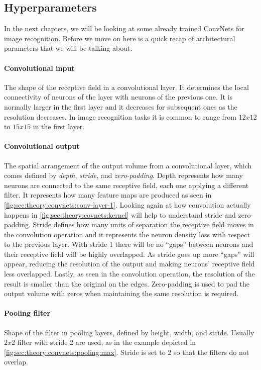 \subsection{Hyperparameters}
\label{sub:theory:convnets:achitecture}

In the next chapters, we will be looking at some already trained ConvNets for image recognition.
Before we move on here is a quick recap of architectural parameters that we will be talking about.

\paragraph{Convolutional input}
The shape of the receptive field in a convolutional layer.
It determines the local connectivity of neurons of the layer with neurons of the previous one.
It is normally larger in the first layer and it decreases for subsequent ones as the resolution decreases.
In image recognition tasks it is common to range from $12x12$ to $15x15$ in the first layer.

\paragraph{Convolutional output}
The spatial arrangement of the output volume from a convolutional layer, which comes defined by \emph{depth}, \emph{stride}, and \emph{zero-padding}.
Depth represents how many neurons are connected to the same receptive field, each one applying a different filter.
It represents how many feature maps are produced as seen in \autoref{fig:sec:theory:convnets:conv-layer-1}.
Looking again at how convolution actually happens in \autoref{fig:sec:theory:covnets:kernel} will help to understand stride and zero-padding.
Stride defines how many units of separation the receptive field moves in the convolution operation and it represents the neuron density loss with respect to the previous layer.
With stride 1 there will be no ``gaps'' between neurons and their receptive field will be highly overlapped.
As stride goes up more ``gaps'' will appear, reducing the resolution of the output and making neurons' receptive field less overlapped.
Lastly, as seen in the convolution operation, the resolution of the result is smaller than the original on the edges.
Zero-padding is used to pad the output volume with zeros when maintaining the same resolution is required.

\paragraph{Pooling filter}
Shape of the filter in pooling layers, defined by height, width, and stride.
Usually $2x2$ filter with stride 2 are used, as in the example depicted in \autoref{fig:sec:theory:convnets:pooling:max}.
Stride is set to 2 so that the filters do not overlap.

